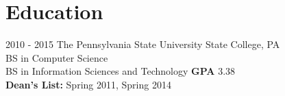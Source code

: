 \documentclass[]{friggeri-cv}
\begin{document}

\section{Education}
\begin{entrylist}
  \entry
    {2010 - 2015}
    {The Pennsylvania State University \hfill \hfill State College, PA}
    {\\BS in Computer Science \\BS in Information Sciences and Technology}
    {\textbf{GPA} 3.38\\
    \textbf{Dean's List:} Spring 2011, Spring 2014}

\end{entrylist}
\end{document}
